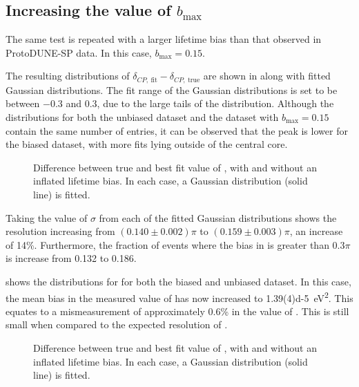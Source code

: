 \subsection{Increasing the value of $b_{\text{max}}$}

The same test is repeated with a larger lifetime bias than that observed in ProtoDUNE-SP data. 
In this case, $b_{\text{max}} = 0.15$.

The resulting distributions of $\delta_{CP,~\text{fit}} - \delta_{CP,~\text{true}}$ are shown in  along with fitted Gaussian distributions.
The fit range of the Gaussian distributions is set to be between \num{-0.3} and \num{0.3}, due to the large tails of the distribution.
Although the distributions for both the unbiased dataset and the dataset with $b_{\text{max}} = 0.15$ contain the same number of entries, it can be observed that the peak is lower for the biased dataset, with more fits lying outside of the central core.

\begin{figure}[h]
	\begin{adjustbox}{max totalsize=.6\textwidth, center}
		
	\end{adjustbox}
	\caption[Difference between true and best fit value of \dcp, with and without an inflated lifetime bias.]{Difference between true and best fit value of \dcp, with and without an inflated lifetime bias. In each case, a Gaussian distribution (solid line) is fitted.}
	\label{fig:paramComp15pc:delta}
\end{figure}

Taking the value of $\sigma$ from each of the fitted Gaussian distributions shows the \dcp resolution increasing from $(0.140 \pm 0.002)\pi$ to $(0.159 \pm 0.003)\pi$, an increase of 14\%.
Furthermore, the fraction of events where the bias in \dcp is greater than $0.3\pi$ is increase from 0.132 to 0.186.

 shows the distributions for  for both the biased and unbiased dataset.
In this case, the mean bias in the measured value of  has now increased to \SI{1.39(4)d-5}{\eV\squared}.
This equates to a mismeasurement of approximately 0.6\% in the value of .
This is still small when compared to the expected resolution of .  

\begin{figure}[h]
	\begin{adjustbox}{max totalsize=.6\textwidth, center}
		
	\end{adjustbox}
	\caption[Difference between true and best fit value of , with and without an inflated lifetime bias.]{Difference between true and best fit value of , with and without an inflated lifetime bias. In each case, a Gaussian distribution (solid line) is fitted.}
	\label{fig:paramComp15pc:dmsq32}
\end{figure}

